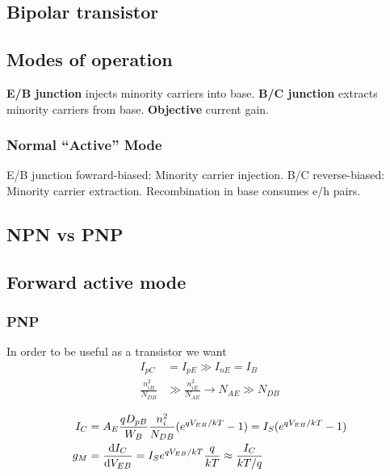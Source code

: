 \documentclass[a4paper, fontsize=8pt, landscape, DIV=1]{scrartcl}
\begin{document}
\begin{multicols*}{4}
    \section{Bipolar transistor}
    \subsection{Modes of operation}
    \textbf{E/B junction} injects minority carriers into base. \textbf{B/C junction} extracts minority carriers from base. \textbf{Objective} current gain.
    

    \subsubsection{Normal ``Active'' Mode}
    E/B junction fowrard-biased: Minority carrier injection. B/C reverse-biased: Minority carrier extraction.
    Recombination in base consumes e/h pairs.
    

    \subsection{NPN vs PNP}

    \subsection{Forward active mode}
    \subsubsection{PNP}

    In order to be useful as a transistor we want
    \begin{align*}
      I_{pC} &= I_{pE} \gg I_{nE} = I_B \\
      \frac{n_{iB}^2}{N_{DB}} &\gg \frac{n_{iE}^2}{N_{AE}} \to N_{AE} \gg N_{DB}
    \end{align*}


    \begin{align*}
      I_C &= A_E \frac{qD_{pB}}{W_B} \frac{n_i^2}{N_{DB}} (e^{qV_{EB}/kT} - 1) = I_S(e^{qV_{EB}/kT} - 1) \\
      g_M &= \frac{\mathrm{d}I_C}{\mathrm{d}V_{EB}} = I_S e^{qV_{EB}/kT} \frac{q}{kT} \approx \frac{I_C}{kT/q}
    \end{align*}


\end{multicols*}
\end{document}
